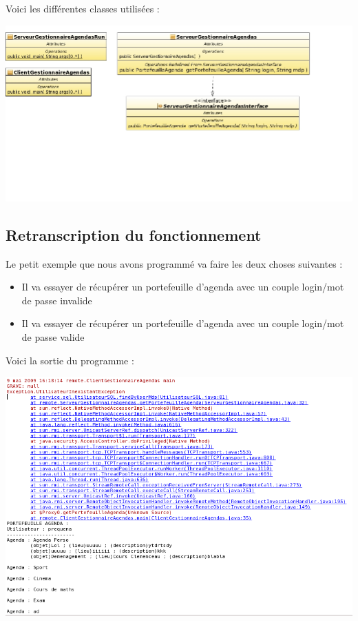 \documentclass[12pt , a4paper]{article}
\begin{document}
\noindent Voici les différentes classes utilisées :
\begin{center}
  \includegraphics[scale=0.5]{./images/rmi.jpg}
\end{center}

\subsection{Retranscription du fonctionnement}
\noindent Le petit exemple que nous avons programmé va faire les deux choses suivantes :
\begin{itemize}
\item Il va essayer de récupérer un portefeuille d'agenda avec un couple login/mot de passe invalide
\item Il va essayer de récupérer un portefeuille d'agenda avec un couple login/mot de passe valide
\end{itemize}
Voici la sortie du programme : 
\begin{center}
  \includegraphics[scale=0.5]{./images/rmi-sortie.png}
\end{center}
\end{document}
